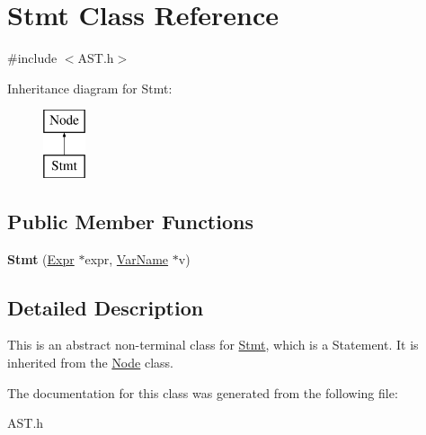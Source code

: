 \hypertarget{class_stmt}{}\section{Stmt Class Reference}
\label{class_stmt}


{\ttfamily \#include $<$A\+S\+T.\+h$>$}

Inheritance diagram for Stmt\+:\begin{figure}[H]
\begin{center}
\leavevmode
\includegraphics[height=2.000000cm]{class_stmt}
\end{center}
\end{figure}
\subsection*{Public Member Functions}
\begin{DoxyCompactItemize}
\item 
\hypertarget{class_stmt_a56efd13b8401f115b072404bd12a0753}{}{\bfseries Stmt} (\hyperlink{class_expr}{Expr} $\ast$expr, \hyperlink{class_var_name}{Var\+Name} $\ast$v)\label{class_stmt_a56efd13b8401f115b072404bd12a0753}

\end{DoxyCompactItemize}


\subsection{Detailed Description}
This is an abstract non-\/terminal class for \hyperlink{class_stmt}{Stmt}, which is a Statement. It is inherited from the \hyperlink{class_node}{Node} class. 

The documentation for this class was generated from the following file\+:\begin{DoxyCompactItemize}
\item 
A\+S\+T.\+h\end{DoxyCompactItemize}
